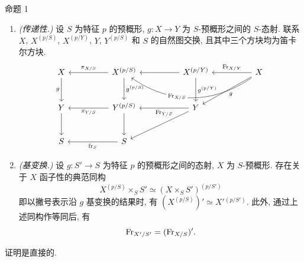 \begin{statement}{命题 1}
\begin{enumerate}[label=\alph*)]
\item \emph{(传递性.)} 设 $S$ 为特征 $p$ 的预概形, $g:X\to Y$ 为 $S$-预概形之间的 $S$-态射. 联系 $X$, $X^{(p/S)}$, $X^{(p/Y)}$, $Y$, $Y^{(p/S)}$ 和 $S$ 的自然图交换, 且其中三个方块均为笛卡尔方块.
\[
\begin{tikzcd}[column sep=huge,row sep=large]
X \arrow[d,"g"'] & X^{(p/S)} \arrow[l,"\pi_{X/S}"'] \arrow[d,"g^{(p/S)}"] & X^{(p/Y)} \arrow[l] \arrow[d,"g^{(p/Y)}"] & X \arrow[l,"\Fr_{X/Y}"'] \arrow[ll,bend left=35,"\Fr_{X/S}"{description,pos=0.62}] \arrow[dl,"g"] \\
Y \arrow[d] & Y^{(p/S)} \arrow[l,"\pi_{Y/S}"] \arrow[d] & Y \arrow[l,"\Fr_{Y/S}"] \arrow[dl] & {} \\
S & S \arrow[l,"\fr_S"] & {} & {}
\end{tikzcd}
\]

\item \emph{(基变换.)} 设 $g:S'\to S$ 为特征 $p$ 的预概形之间的态射, $X$ 为 $S$-预概形. 存在关于 $X$ 函子性的典范同构
\[
X^{(p/S)}\times_S S'\simeq (X\times_S S')^{(p/S')}
\]
即以撇号表示沿 $g$ 基变换的结果时, 有 $(X^{(p/S)})'\simeq X'{}^{(p/S')}$. 此外, 通过上述同构作等同后, 有
\[
\operatorname{Fr}_{X'/S'}=(\operatorname{Fr}_{X/S})'
.\]

\end{enumerate}
\end{statement}

证明是直接的.

